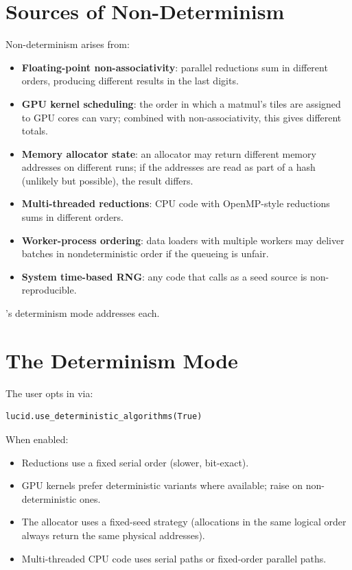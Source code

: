 \section{Sources of Non-Determinism}
\label{sec:reproducibility:sources}

Non-determinism arises from:

\begin{itemize}
  \item \textbf{Floating-point non-associativity}: parallel
    reductions sum in different orders, producing different
    results in the last digits.
  \item \textbf{GPU kernel scheduling}: the order in which a
    matmul's tiles are assigned to GPU cores can vary; combined
    with non-associativity, this gives different totals.
  \item \textbf{Memory allocator state}: an allocator may
    return different memory addresses on different runs;
    if the addresses are read as part of a hash (unlikely but
    possible), the result differs.
  \item \textbf{Multi-threaded reductions}: CPU code with
    OpenMP-style reductions sums in different orders.
  \item \textbf{Worker-process ordering}: data loaders with
    multiple workers may deliver batches in nondeterministic
    order if the queueing is unfair.
  \item \textbf{System time-based RNG}: any code that calls
     as a seed source is non-reproducible.
\end{itemize}

\Lucid's determinism mode addresses each.

\section{The Determinism Mode}
\label{sec:reproducibility:det_mode}

The user opts in via:

\begin{lstlisting}[style=lucid,language=LucidPython]
lucid.use_deterministic_algorithms(True)
\end{lstlisting}

When enabled:

\begin{itemize}
  \item Reductions use a fixed serial order (slower, bit-exact).
  \item GPU kernels prefer deterministic variants where
    available; raise on non-deterministic ones.
  \item The allocator uses a fixed-seed strategy (allocations
    in the same logical order always return the same physical
    addresses).
  \item Multi-threaded CPU code uses serial paths or
    fixed-order parallel paths.
\end{itemize}

